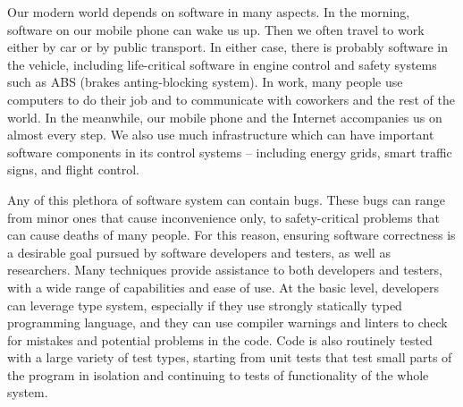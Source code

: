 Our modern world depends on software in many aspects.
In the morning, software on our mobile phone can wake us up.
Then we often travel to work either by car or by public transport.
In either case, there is probably software in the vehicle, including life-critical software in engine control and safety systems such as ABS (brakes anting-blocking system).
In work, many people use computers to do their job and to communicate with coworkers and the rest of the world.
In the meanwhile, our mobile phone and the Internet accompanies us on almost every step.
We also use much infrastructure which can have important software components in its control systems -- including energy grids, smart traffic signs, and flight control.

Any of this plethora of software system can contain bugs.
These bugs can range from minor ones that cause inconvenience only, to safety-critical problems that can cause deaths of many people.
For this reason, ensuring software correctness is a desirable goal pursued by software developers and testers, as well as researchers.
Many techniques provide assistance to both developers and testers, with a wide range of capabilities and ease of use.
At the basic level, developers can leverage type system, especially if they use strongly statically typed programming language, and they can use compiler warnings and linters to check for mistakes and potential problems in the code.
Code is also routinely tested with a large variety of test types, starting from unit tests that test small parts of the program in isolation and continuing to tests of functionality of the whole system.

